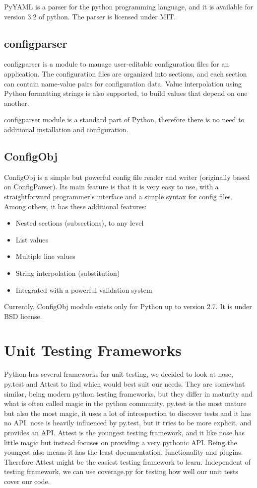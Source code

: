 PyYAML is a parser for the python programming language, and it is available for
version 3.2 of python. The parser is licensed under MIT.

\subsection{configparser}
configparser is a module to manage user-editable configuration files for an
application. The configuration files are organized into sections, and each
section can contain name-value pairs for configuration data. Value
interpolation using Python formatting strings is also supported, to build
values that depend on one another.

configparser module is a standard part of Python, therefore there is no need
to additional installation and configuration.

\subsection{ConfigObj}
ConfigObj is a simple but powerful config file reader and writer (originally
based on ConfigParser). Its main feature is that it is very easy to use, with
a straightforward programmer's interface and a simple syntax for config files.
Among others, it has these additional features:
\begin{itemize}
	\item Nested sections (subsections), to any level
	\item List values
	\item Multiple line values
	\item String interpolation (substitution)
	\item Integrated with a powerful validation system
\end{itemize}

\noindent Currently, ConfigObj module exists only for Python up to version
2.7. It is under BSD license.


\section{Unit Testing Frameworks}
\label{sec:pre:testing}
Python has several frameworks for unit testing, we decided to look at nose,
py.test and Attest to find which would best suit our needs. They are somewhat
similar, being modern python testing frameworks, but they differ in maturity
and what is often called magic in the python community. py.test is the most
mature but also the most magic, it uses a lot of introspection to discover
tests and it has no API. nose is heavily influenced by py.test, but it tries to
be more explicit, and provides an API. Attest is the youngest testing
framework, and it like nose has little magic but instead focuses on providing
a very pythonic API. Being the youngest also means it has the least
documentation, functionality and plugins. Therefore Attest might be the easiest
testing framework to learn. Independent of testing framework, we can use
coverage.py for testing how well our unit tests cover our code.


